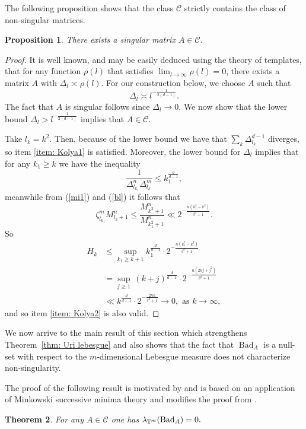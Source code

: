 \documentclass[reqno,11pt, twoside]{amsart}
\theoremstyle{plain}
\newtheorem{thm}{Theorem}[section]
\newtheorem{prop}[thm]{Proposition}
\theoremstyle{definition}
\theoremstyle{definition}
\theoremstyle{remark}
\numberwithin{equation}{section}
\newcommand{\Del}{\Delta}
\newcommand{\cC}{\mathcal{C}}
\newcommand\on[1]{\operatorname{#1}}
\begin{document}
The following proposition shows that the class $\cC$ strictly contains 
the class of non-singular matrices.
\begin{prop}\label{abcde}
There exists a singular matrix $A\in \cC$.
\end{prop}
\begin{proof}
It is well known, and may be easily deduced using the theory of templates,
that for any function $\rho(l)$ that satisfies $\lim_{l\to\infty}\rho(l)=0$, there exists a matrix $A$ with $\Del_l\asymp \rho(l)$. For our construction below, we choose $A$ such that 
$$\Del_l\asymp l^{-\frac{1}{2(d-1)}}.$$
The fact that $A$ is singular follows since $\Del_l\to 0$. We now show that the lower bound 
$\Delta_l>l^{-\frac{1}{2(d-1)}}$ implies that $A\in \cC$. 

Take $l_k = k^2$. Then, because of the lower bound we have that
$\sum_k \Delta_{l_k}^{d-1}$ diverges, so item \eqref{item: Kolya1} is satisfied. 
Moreover, the lower bound for $\Delta_l$ implies that for any
$k_1\ge k$ we have the inequality
$$
\frac{1}{
\Delta_{l_{k_1}}^n \Delta_{l_k}^m} \le k_1^{\frac{d}{d-1}},
$$
meanwhile
from (\ref{mi1}) and (\ref{bl}) it follows that 
$$
\zeta_{l_{k_1}}^m M_{l_k+1}^n \le
\frac{M_{k^2+1}^n}{M_{k_1^2+1}^n}\ll  2^{-\frac{n(k_1^2 - k^2)}{3^d+1}}.
$$
So 
\begin{align*}
H_k &\le \sup_{k_1\ge k+1} k_1^{\frac{d}{d-1}} \cdot 2^{-\frac{n(k_1^2 - k^2)}{3^d+1}}\\
&=
\sup_{j\ge 1} \, (k+j)^{\frac{d}{d-1}} \cdot 2^{-\frac{n(2kj+j^2)}{3^d+1}}\\
&\ll k^{\frac{d}{d-1}}\cdot 2^{-\frac{2nk}{3^d+1}} \to 0, \textrm{ as } k \to \infty
,
\end{align*}
and so item \eqref{item: Kolya2} is also valid.
\end{proof}
We now arrive to the main result of this section which strengthens
Theorem~\ref{thm: Uri lebesgue} and also shows that the fact that 
$\on{Bad}_A$ is a null-set with respect to the $m$-dimensional Lebesgue measure does not characterize non-singularity.
 


The proof of the following result is motivated by \cite[Theorem 1.7]{Kim-Kurzweil} and is based on an application of  Minkowski successive minima theory and modifies the proof from \cite{Mosh-welldistributed}.

\begin{thm}\label{thm: Kolya}
For any $A\in \cC$ one has
$\lambda_{\mathbb{T}^m} ({\rm Bad}_A) =0.
 $
\end{thm}
\end{document}
